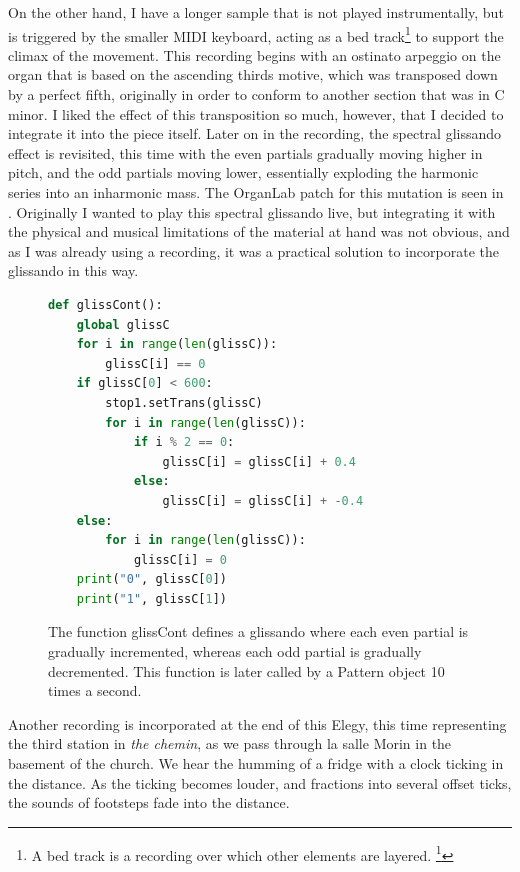 \documentclass[12pt,twoside,maitrise]{dms_ks}
\theoremstyle{definition}
\begin{document}
{{On the other hand, I have a longer sample that is not played instrumentally, but is triggered by the smaller MIDI keyboard, acting as a bed track\footnote{A bed track is a recording over which other elements are layered. \footcite{attariwala_re-imagining_2021}} to support the climax of the movement. 
This recording begins with an ostinato arpeggio on the organ that is based on the ascending thirds motive, which was transposed down by a perfect fifth, originally in order to conform to another section that was in C minor. 
I liked the effect of this transposition so much, however, that I decided to integrate it into the piece itself. 
Later on in the recording, the spectral glissando effect is revisited, this time with the even partials gradually moving higher in pitch, and the odd partials moving lower, essentially exploding the harmonic series into an inharmonic mass. 
The OrganLab patch for this mutation is seen in .
Originally I wanted to play this spectral glissando live, but integrating it with the physical and musical limitations of the material at hand was not obvious, and as I was already using a recording, it was a practical solution to incorporate the glissando in this way.

\begin{figure}[H]
\begin{lstlisting}[language=Python]
def glissCont():
    global glissC
    for i in range(len(glissC)):
        glissC[i] == 0
    if glissC[0] < 600:
        stop1.setTrans(glissC)
        for i in range(len(glissC)):
            if i % 2 == 0:
                glissC[i] = glissC[i] + 0.4
            else:
                glissC[i] = glissC[i] + -0.4
    else:
        for i in range(len(glissC)):
            glissC[i] = 0
    print("0", glissC[0])
    print("1", glissC[1])
\end{lstlisting}
\caption{The function glissCont defines a glissando where each even partial is gradually incremented, whereas each odd partial is gradually decremented. This function is later called by a Pattern object 10 times a second.}
\label{fig:glisscont}
\end{figure}

Another recording is incorporated at the end of this Elegy, this time representing the third station in \textit{the chemin}, as we pass through la salle Morin in the basement of the church. We hear the humming of a fridge with a clock ticking in the distance. As the ticking becomes louder, and fractions into several offset ticks, the sounds of footsteps fade into the distance.

}}
\end{document}
